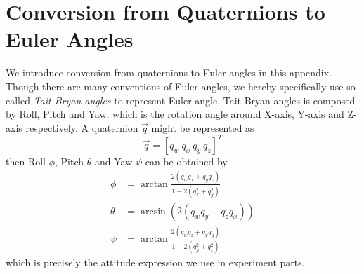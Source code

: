 \chapter{Conversion from Quaternions to Euler Angles}
\label{chap:appendix3}

We introduce conversion from quaternions to Euler angles in this appendix. Though there are many conventions of Euler angles, we hereby specifically use so-called \textit{Tait Bryan angles} to represent Euler angle. Tait Bryan angles is composed by Roll, Pitch and Yaw, which is the rotation angle around X-axis, Y-axis and Z-axis respectively. A quaternion $\vec{q}$ might be represented as
\begin{equation}
	\vec{q} = \left[ q_w \ q_x \ q_y \ q_z \right]^T
\end{equation}
then Roll $\phi$, Pitch $\theta$ and Yaw $\psi$ can be obtained by
\begin{align}
	\phi &= \arctan{\frac{2(q_w q_x+q_y q_z)}{1-2(q_x^2+q_y^2)}}\\
	\theta &= \arcsin{(2(q_wq_y-q_zq_x))}\\
	\psi &= \arctan{\frac{2(q_w q_z+q_x q_y)}{1-2(q_y^2+q_z^2)}}
\end{align}
which is precisely the attitude expression we use in experiment parts.
\clearpage
\newpage
